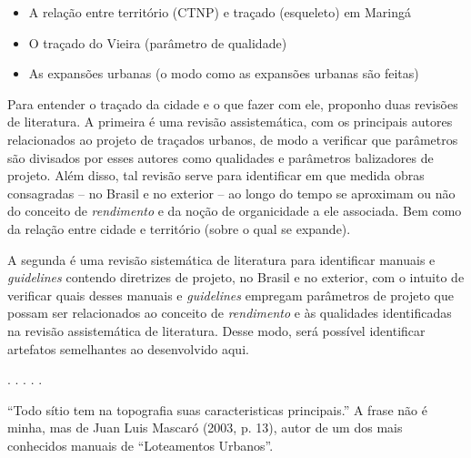 \documentclass[12pt, a4paper]{book} %
\begin{document}
            \begin{itemize} %
                \item A relação entre território (CTNP) e traçado (esqueleto) em Maringá
                \item O traçado do Vieira (parâmetro de qualidade)
                \item As expansões urbanas (o modo como as expansões urbanas são feitas)
            \end{itemize}

            Para entender o traçado da cidade e o que fazer com ele, proponho duas revisões de literatura. A primeira é uma revisão assistemática, com os principais autores relacionados ao projeto de traçados urbanos, de modo a verificar que parâmetros são divisados por esses autores como qualidades e parâmetros balizadores de projeto. Além disso, tal revisão serve para identificar em que medida obras consagradas – no Brasil e no exterior – ao longo do tempo se aproximam ou não do conceito de \textit{rendimento} e da noção de organicidade a ele associada. Bem como da relação entre cidade e território (sobre o qual se expande).

            A segunda é uma revisão sistemática de literatura para identificar manuais e \textit{guidelines} contendo diretrizes de projeto, no Brasil e no exterior, com o intuito de verificar quais desses manuais e \textit{guidelines} empregam parâmetros de projeto que possam ser relacionados ao conceito de \textit{rendimento} e às qualidades identificadas na revisão assistemática de literatura. Desse modo, será possível identificar artefatos semelhantes ao desenvolvido aqui.

        \begin{center}
        . . . . .
        \end{center} 

            ``Todo sítio tem na topografia suas caracteristicas principais.'' A frase não é minha, mas de Juan Luis Mascaró (2003, p. 13), autor de um dos mais conhecidos manuais de ``Loteamentos Urbanos''.
\end{document}
